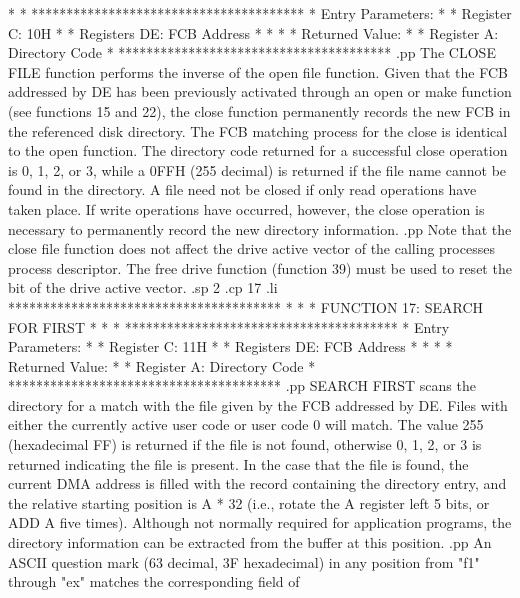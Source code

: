 *                                     *
***************************************
*  Entry Parameters:                  *
*      Register   C:  10H             *
*      Registers DE:  FCB Address     *
*                                     *
*  Returned   Value:                  *
*      Register   A:  Directory Code  *
***************************************
.pp
The CLOSE FILE function performs the inverse of the open file
function.  Given that the FCB addressed by DE has been previously
activated through an open or make function (see functions 15 and 22),
the close function permanently records the new FCB in the referenced
disk directory.  The FCB matching process for the close is identical
to the open function.  The directory code returned for a successful
close operation is 0, 1, 2, or 3, while a 0FFH (255 decimal) is
returned if the file name cannot be found in the directory.
A file need not be closed if only read operations have taken
place.  If write operations have occurred, however, the close operation
is necessary to permanently record the new directory information.
.pp
Note that the close file function does not affect the drive active
vector of the calling processes process descriptor.  The free drive
function (function 39) must be used to reset the bit of the drive
active vector.
.sp 2
.cp 17
.li
***************************************
*                                     *
*  FUNCTION 17: SEARCH FOR FIRST      *
*                                     *
***************************************
*  Entry Parameters:                  *
*      Register   C:  11H             *
*      Registers DE:  FCB Address     *
*                                     *
*  Returned   Value:                  *
*      Register   A:  Directory Code  *
***************************************
.pp
SEARCH FIRST scans the directory for a match with the file
given by the FCB addressed by DE.
Files with either the currently active user code or user code 0
will match.
The value 255 (hexadecimal
FF) is returned if the file is not found, otherwise
0, 1, 2, or 3 is returned indicating the file is present.
In the case that the file is found, the current DMA address
is filled with the record containing the directory entry,
and the relative starting position is A * 32 (i.e., rotate
the A register left 5 bits, or ADD A five times).  Although
not normally required for application programs, the directory
information can be extracted from the buffer at this position.
.pp
An ASCII question mark (63 decimal, 3F hexadecimal) in any
position from "f1" through "ex" matches
the corresponding field of
